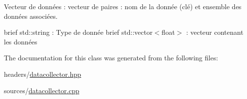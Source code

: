 Vecteur de données \+: vecteur de paires \+: nom de la donnée (clé) et ensemble des données associées. 

brief std\+::string \+: Type de donnée brief std\+::vector$<$float$>$ \+: vecteur contenant les données 

The documentation for this class was generated from the following files\+:\begin{DoxyCompactItemize}
\item 
headers/\hyperlink{datacollector_8hpp}{datacollector.\+hpp}\item 
sources/\hyperlink{datacollector_8cpp}{datacollector.\+cpp}\end{DoxyCompactItemize}
